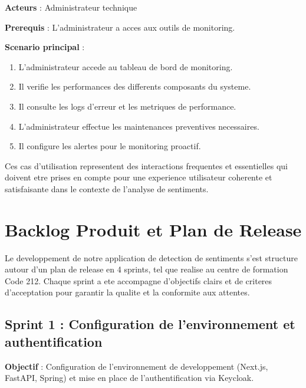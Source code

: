 \textbf{Acteurs} : Administrateur technique

\textbf{Prerequis} : L'administrateur a acces aux outils de monitoring.

\textbf{Scenario principal} :
\begin{enumerate}
    \item L'administrateur accede au tableau de bord de monitoring.
    \item Il verifie les performances des differents composants du systeme.
    \item Il consulte les logs d'erreur et les metriques de performance.
    \item L'administrateur effectue les maintenances preventives necessaires.
    \item Il configure les alertes pour le monitoring proactif.
\end{enumerate}

Ces cas d'utilisation representent des interactions frequentes et essentielles qui doivent etre prises en compte pour une experience utilisateur coherente et satisfaisante dans le contexte de l'analyse de sentiments.

\section{Backlog Produit et Plan de Release}

Le developpement de notre application de detection de sentiments s'est structure autour d'un plan de release en 4 sprints, tel que realise au centre de formation Code 212. Chaque sprint a ete accompagne d'objectifs clairs et de criteres d'acceptation pour garantir la qualite et la conformite aux attentes.

\subsection{Sprint 1 : Configuration de l'environnement et authentification}

\textbf{Objectif} : Configuration de l'environnement de developpement (Next.js, FastAPI, Spring) et mise en place de l'authentification via Keycloak.

